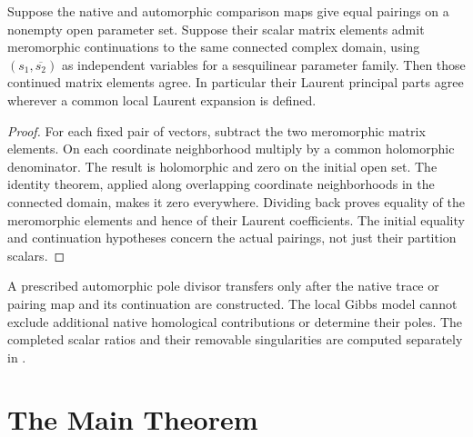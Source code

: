 \begin{proposition}
\label{v4-arith:kp:prop:pole-matching}
Suppose the native and automorphic comparison maps give equal pairings
on a nonempty open parameter set. Suppose their scalar matrix elements
admit meromorphic continuations to the same connected complex domain,
using \((s_1,\overline{s_2})\) as independent variables for a
sesquilinear parameter family. Then those continued matrix elements
agree. In particular their Laurent principal parts agree wherever a
common local Laurent expansion is defined.
\end{proposition}
\begin{proof}
For each fixed pair of vectors, subtract the two meromorphic matrix
elements. On each coordinate neighborhood multiply by a common
holomorphic denominator. The result is holomorphic and zero on the
initial open set. The identity theorem, applied along overlapping
coordinate neighborhoods in the connected domain, makes it zero
everywhere. Dividing back proves equality of the meromorphic elements
and hence of their Laurent coefficients. The initial equality and
continuation hypotheses concern the actual pairings, not just their
partition scalars.
\end{proof}

\begin{remark}
\label{v4-arith:kp:analytic-cont:no-exotic}
\label{v4-arith:kp:rem:no-new-residue}
A prescribed automorphic pole divisor transfers only after the native
trace or pairing map and its continuation are constructed. The local
Gibbs model cannot exclude additional native homological contributions
or determine their poles. The completed scalar ratios and their
removable singularities are computed separately in
.
\end{remark}

\section{The Main Theorem}
\label{v4-arith:kp:main-theorem}


